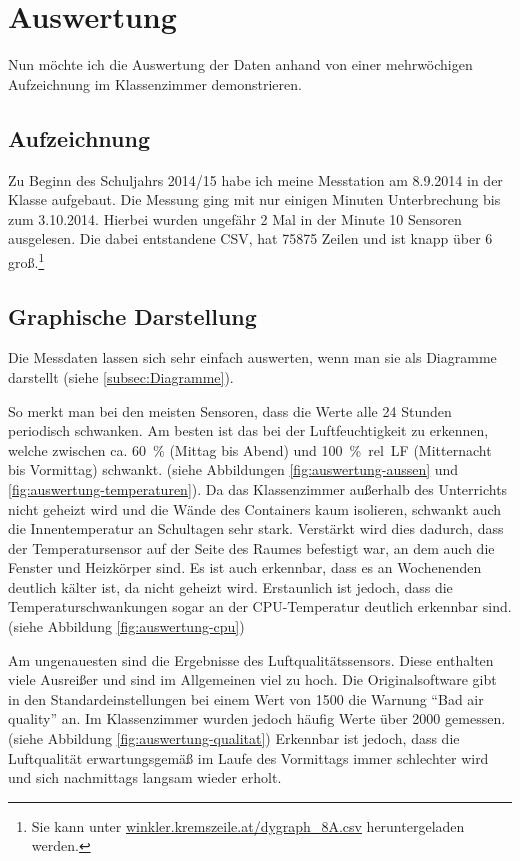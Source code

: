 \chapter{Auswertung}
\label{cha:Auswertung}

Nun möchte ich die Auswertung der Daten anhand von einer mehrwöchigen Aufzeichnung im Klassenzimmer demonstrieren.

\section{Aufzeichnung}
\label{auswertung_aufzeichnung}

Zu Beginn des Schuljahrs 2014/15 habe ich meine Messtation am 8.9.2014 in der Klasse aufgebaut. Die Messung ging mit nur einigen Minuten Unterbrechung bis zum 3.10.2014. Hierbei wurden ungefähr 2 Mal in der Minute 10 Sensoren ausgelesen. Die dabei entstandene \gls{CSV}, hat 75875 Zeilen und ist knapp über \SI{6}{\mega\byte} groß.\footnote{Sie kann unter \href{http://winkler.kremszeile.at/dygraph_8A.csv}{winkler.kremszeile.at/dygraph\_8A.csv} heruntergeladen werden.}

\section{Graphische Darstellung}

Die Messdaten lassen sich sehr einfach auswerten, wenn man sie als Diagramme darstellt (siehe \ref{subsec:Diagramme}). 

So merkt man bei den meisten Sensoren, dass die Werte alle 24 Stunden periodisch schwanken. Am besten ist das bei der Luftfeuchtigkeit zu erkennen, welche zwischen ca. \SI{60}{\%} (Mittag bis Abend) und \SI{100}{\%.rel.LF} (Mitternacht bis Vormittag) schwankt. (siehe Abbildungen \ref{fig:auswertung-aussen} und \ref{fig:auswertung-temperaturen}).
Da das Klassenzimmer außerhalb des Unterrichts nicht geheizt wird und die Wände des Containers kaum isolieren, schwankt auch die Innentemperatur an Schultagen sehr stark. Verstärkt wird dies dadurch, dass der Temperatursensor auf der Seite des Raumes befestigt war, an dem auch die Fenster und Heizkörper sind. Es ist auch erkennbar, dass es an Wochenenden deutlich kälter  ist, da nicht geheizt wird. 
Erstaunlich ist jedoch, dass die Temperaturschwankungen sogar an der \gls{CPU}-Temperatur deutlich erkennbar sind. (siehe Abbildung \ref{fig:auswertung-cpu})

Am ungenauesten sind die Ergebnisse des Luftqualitätssensors. Diese enthalten viele Ausreißer und sind im Allgemeinen viel zu hoch. Die Originalsoftware gibt in den Standardeinstellungen bei einem Wert von 1500 die Warnung \enquote{Bad air quality} an. Im Klassenzimmer wurden jedoch häufig Werte über 2000 gemessen. (siehe Abbildung \ref{fig:auswertung-qualitat}) Erkennbar ist jedoch, dass die Luftqualität erwartungsgemäß im Laufe des Vormittags immer  schlechter wird und sich nachmittags langsam wieder erholt. 

